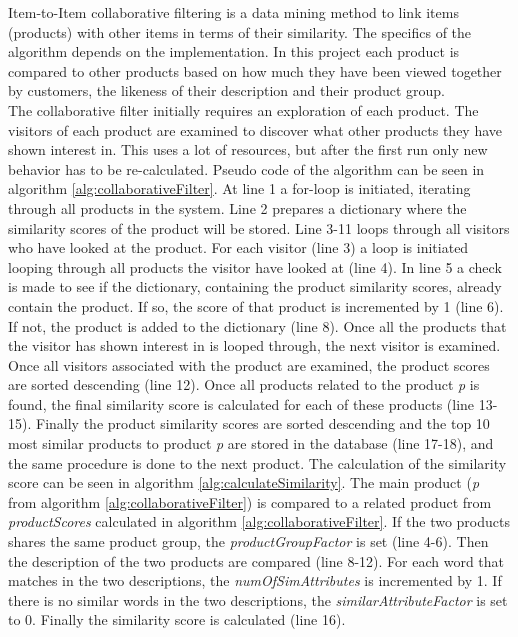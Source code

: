 Item-to-Item collaborative filtering is a data mining method to link items (products) with other items in terms of their similarity.
The specifics of the algorithm depends on the implementation. In this project each product is compared to other products based on how much they have been viewed together by customers, the likeness of their description and their product group. \\
The collaborative filter initially requires an exploration of each product. The visitors of each product are examined to discover what other products they have shown interest in. This uses a lot of resources, but after the first run only new behavior has to be re-calculated. Pseudo code of the algorithm can be seen in algorithm \ref{alg:collaborativeFilter}. At line 1 a for-loop is initiated, iterating through all products in the system. Line 2 prepares a dictionary where the similarity scores of the product will be stored. Line 3-11 loops through all visitors who have looked at the product. For each visitor (line 3) a loop is initiated looping through all products the visitor have looked at (line 4). In line 5 a check is made to see if the dictionary, containing the product similarity scores, already contain the product. If so, the score of that product is incremented by 1 (line 6). If not, the product is added to the dictionary (line 8). Once all the products that the visitor has shown interest in is looped through, the next visitor is examined. Once all visitors associated with the product are examined, the product scores are sorted descending (line 12). Once all products related to the product \textit{p} is found, the final similarity score is calculated for each of these products (line 13-15). Finally the product similarity scores are sorted descending and the top 10 most similar products to product \textit{p} are stored in the database (line 17-18), and the same procedure is done to the next product. The calculation of the similarity score can be seen in algorithm \ref{alg:calculateSimilarity}. The main product (\textit{p} from algorithm \ref{alg:collaborativeFilter}) is compared to a related product from \textit{productScores} calculated in algorithm \ref{alg:collaborativeFilter}. If the two products shares the same product group, the \textit{productGroupFactor} is set (line 4-6). Then the description of the two products are compared (line 8-12). For each word that matches in the two descriptions, the \textit{numOfSimAttributes} is incremented by 1. If there is no similar words in the two descriptions, the \textit{similarAttributeFactor} is set to 0. Finally the similarity score is calculated (line 16).\\\\

